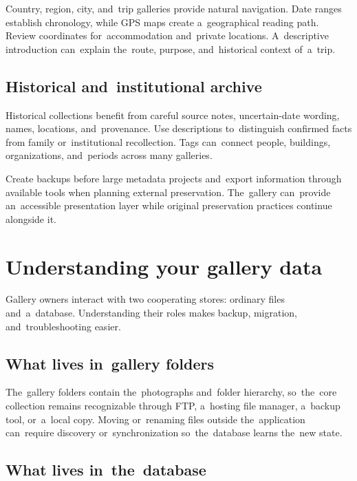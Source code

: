 \documentclass[11pt,a4paper]{article}
\begin{document}
Country, region, city, and~trip galleries provide natural navigation. Date
ranges establish chronology, while GPS maps create a~geographical reading path.
Review coordinates for~accommodation and~private locations. A~descriptive
introduction can~explain the~route, purpose, and~historical context of~a~trip.

\subsection{Historical and~institutional archive}

Historical collections benefit from careful source notes, uncertain-date
wording, names, locations, and~provenance. Use descriptions to~distinguish
confirmed facts from family or~institutional recollection. Tags can~connect
people, buildings, organizations, and~periods across many galleries.

Create backups before large metadata projects and~export information through
available tools when planning external preservation. The~gallery can~provide
an~accessible presentation layer while original preservation practices continue
alongside it.

\section{Understanding your gallery data}
\label{sec:user-data}

Gallery owners interact with two cooperating stores: ordinary files
and~a~database. Understanding their roles makes backup, migration,
and~troubleshooting easier.

\subsection{What lives in~gallery folders}

The~gallery folders contain the~photographs and~folder hierarchy, so~the~core
collection remains recognizable through FTP, a~hosting file manager, a~backup
tool, or~a~local copy. Moving or~renaming files outside the~application
can~require discovery or~synchronization so~the~database learns the~new state.

\subsection{What lives in~the~database}
\end{document}
